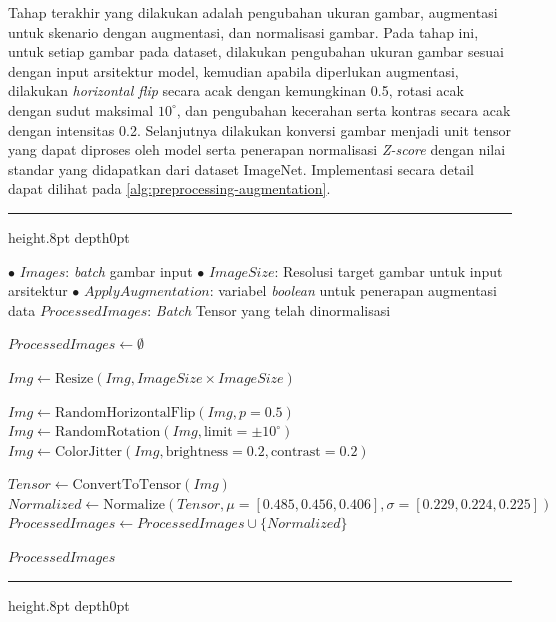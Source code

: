 Tahap terakhir yang dilakukan adalah pengubahan ukuran gambar, augmentasi untuk skenario dengan augmentasi, dan normalisasi gambar. Pada tahap ini, untuk setiap gambar pada dataset, dilakukan pengubahan ukuran gambar sesuai dengan input arsitektur model, kemudian apabila diperlukan augmentasi, dilakukan \textit{horizontal flip} secara acak dengan kemungkinan 0.5, rotasi acak dengan sudut maksimal $10^\circ$, dan pengubahan kecerahan serta kontras secara acak dengan intensitas 0.2. Selanjutnya dilakukan konversi gambar menjadi unit tensor yang dapat diproses oleh model serta penerapan normalisasi \textit{Z-score} dengan nilai standar yang didapatkan dari dataset ImageNet. Implementasi secara detail dapat dilihat pada \autoref{alg:preprocessing-augmentation}. 

{
	\vspace{2ex}
	\hrule height.8pt depth0pt \kern5pt
	
	\begin{algorithmic}[1]
		\Input 
		\Statex $\bullet$ $Images$: \textit{batch} gambar input
		\Statex $\bullet$ $ImageSize$: Resolusi target gambar untuk input arsitektur
		\Statex $\bullet$ $ApplyAugmentation$: variabel \textit{boolean} untuk penerapan augmentasi data
		\Output $ProcessedImages$: \textit{Batch} Tensor yang telah dinormalisasi
		
		\State $ProcessedImages \gets \emptyset$
		
		\State $Img \gets \text{Resize}(Img, ImageSize \times ImageSize)$
		
		\State $Img \gets \text{RandomHorizontalFlip}(Img, p=0.5)$
		\State $Img \gets \text{RandomRotation}(Img, \text{limit}=\pm 10^{\circ})$
		\State $Img \gets \text{ColorJitter}(Img, \text{brightness}=0.2, \text{contrast}=0.2)$
		\EndIf
		
		\State $Tensor \gets \text{ConvertToTensor}(Img)$
		\State $Normalized \gets \text{Normalize}(Tensor, \mu=[0.485, 0.456, 0.406], \sigma=[0.229, 0.224, 0.225])$
		\State $ProcessedImages \gets ProcessedImages \cup \{Normalized\}$
		\EndFor
		
		\State \Return $ProcessedImages$
	\end{algorithmic}
	
	\nopagebreak %
	\kern2pt\hrule height.8pt depth0pt \kern15pt 
	\nopagebreak
	
	\label{alg:preprocessing-augmentation}
}

